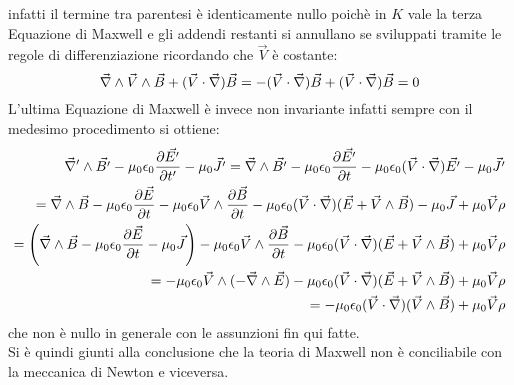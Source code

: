 infatti il termine tra parentesi è identicamente nullo poichè in $K$ vale la terza Equazione di Maxwell 
e gli addendi restanti si annullano se sviluppati tramite le regole di differenziazione ricordando che $\vec{V}$ è costante:
\begin{equation*}
	\vec{\nabla}\wedge\vec{V}\wedge\vec{B}+(\vec{V}\cdot\vec{\nabla})\vec{B}=-(\vec{V}\cdot\vec{\nabla})\vec{B}+(\vec{V}\cdot\vec{\nabla})\vec{B}=0
\end{equation*}
L'ultima Equazione di Maxwell è invece non invariante infatti sempre con il medesimo procedimento si ottiene:
\begin{align*}
	\vec{\nabla}'\wedge\vec{B'}-\mu_0\epsilon_0\frac{\partial \vec{E'}}{\partial t'}-\mu_0\vec{J'}=
	\vec{\nabla}\wedge\vec{B'}-\mu_0\epsilon_0\frac{\partial \vec{E'}}{\partial t}-\mu_0\epsilon_0(\vec{V}\cdot\vec{\nabla})\vec{E'}-\mu_0\vec{J'}\\
	=\vec{\nabla}\wedge\vec{B}-\mu_0\epsilon_0\frac{\partial \vec{E}}{\partial t}-\mu_0\epsilon_0\vec{V}\wedge\frac{\partial \vec{B}}{\partial t}-\mu_0\epsilon_0(\vec{V}\cdot\vec{\nabla})(\vec{E}+\vec{V}\wedge\vec{B})-\mu_0\vec{J}+\mu_0\vec{V}\rho\\
	=\left(\vec{\nabla}\wedge\vec{B}-\mu_0\epsilon_0\frac{\partial \vec{E}}{\partial t}-\mu_0\vec{J}\right)-\mu_0\epsilon_0\vec{V}\wedge\frac{\partial \vec{B}}{\partial t}-\mu_0\epsilon_0(\vec{V}\cdot\vec{\nabla})(\vec{E}+\vec{V}\wedge\vec{B})+\mu_0\vec{V}\rho\\
	=-\mu_0\epsilon_0\vec{V}\wedge(-\vec{\nabla}\wedge\vec{E})-\mu_0\epsilon_0(\vec{V}\cdot\vec{\nabla})(\vec{E}+\vec{V}\wedge\vec{B})+\mu_0\vec{V}\rho\\
	=-\mu_0\epsilon_0(\vec{V}\cdot\vec{\nabla})(\vec{V}\wedge\vec{B})+\mu_0\vec{V}\rho
\end{align*}
che non è nullo in generale con le assunzioni fin qui fatte.\\

Si è quindi giunti alla conclusione che la teoria di Maxwell non è conciliabile con 
la meccanica di Newton e viceversa.